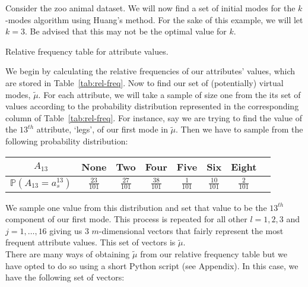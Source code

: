 \begin{example}\label{ex:huang}
    Consider the zoo animal dataset. We will now find a set of initial modes for
    the \(k\)-modes algorithm using Huang's method. For the sake of this
    example, we will let \(k = 3\). Be advised that this may not be the optimal
    value for \(k\).\\
    
    \begin{table}[h]
    \resizebox{\textwidth}{!}{%
        
    }
    \caption{Relative frequency table for attribute values.}\label{tab:rel-freq}
    \end{table}

    We begin by calculating the relative frequencies of our attributes' values, 
    which are stored in Table~\ref{tab:rel-freq}. Now to find our set of 
    (potentially) virtual modes, \(\tilde{\mu}\). For each attribute, we will 
    take a sample of size one from the its set of values according to the 
    probability distribution represented in the corresponding column of 
    Table~\ref{tab:rel-freq}. For instance, say we are trying to find the value
    of the \(13^{th}\) attribute, `legs', of our first mode in \(\tilde{\mu}\).
    Then we have to sample from the following probability distribution:\\
    
    \begin{table}[h]
    \centering
    \begin{tabular}{cccccccc}
        \(A_{13}\) \vline& None & Two & Four & Five & Six & Eight \\
        \midrule\(\mathbb{P}(A_{13} = a_s^{13})\) \vline& \(\frac{23}{101}\) & 
        \(\frac{27}{101}\) & \(\frac{38}{101}\) & \(\frac{1}{101}\) & 
        \(\frac{10}{101}\) & \(\frac{2}{101}\) \\
    \end{tabular}
    \end{table}
    
    We sample one value from this distribution and set that value to be the 
    \(13^{th}\) component of our first mode. This process is repeated for all
    other \(l = 1, 2, 3\) and \(j = 1, \ldots, 16\) giving us \(3\)
    \(m\)-dimensional vectors that fairly represent the most frequent attribute
    values. This set of vectors is \(\tilde{\mu}\).\\

    There are many ways of obtaining \(\tilde{\mu}\) from our relative frequency
    table but we have opted to do so using a short Python script (see Appendix).
    In this case, we have the following set of vectors:


\end{example}
